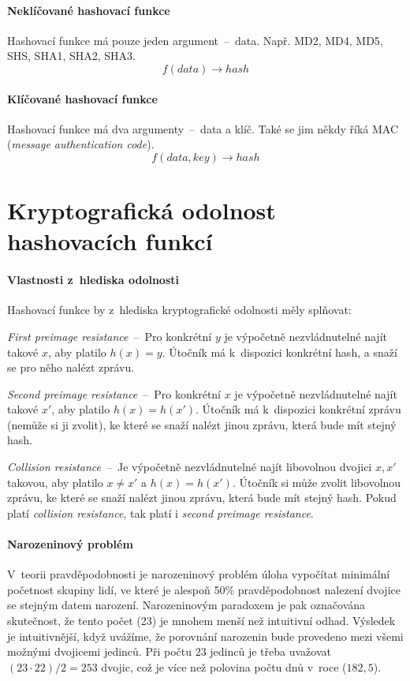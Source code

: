 \paragraph*{Neklíčované hashovací funkce} Hashovací funkce má pouze jeden argument~--~data. Např. MD2, MD4, MD5, SHS, SHA1, SHA2, SHA3. $$f(data) \rightarrow hash$$

\paragraph*{Klíčované hashovací funkce} Hashovací funkce má dva argumenty~--~data a klíč. Také se jim někdy říká MAC (\textit{message authentication code}). $$f(data, key) \rightarrow hash$$


\section{Kryptografická odolnost hashovacích funkcí}

\paragraph*{Vlastnosti z~hlediska odolnosti} Hashovací funkce by z~hlediska kryptografické odolnosti měly splňovat: \begin{compactitem}
    \item \textit{First preimage resistance}~--~Pro konkrétní $y$ je výpočetně nezvládnutelné najít takové $x$, aby platilo $h(x) = y$. Útočník má k~dispozici konkrétní hash, a snaží se pro něho nalézt zprávu.
    \item \textit{Second preimage resistance}~--~Pro konkrétní $x$ je výpočetně nezvládnutelné najít takové $x'$, aby platilo $h(x) = h(x')$. Útočník má k~dispozici konkrétní zprávu (nemůže si ji zvolit), ke které se snaží nalézt jinou zprávu, která bude mít stejný hash.
    \item \textit{Collision resistance}~--~Je výpočetně nezvládnutelné najít libovolnou dvojici $x, x'$ takovou, aby platilo $x \neq x'$ a $h(x) = h(x')$. Útočník si může zvolit libovolnou zprávu, ke které se snaží nalézt jinou zprávu, která bude mít stejný hash. Pokud platí \textit{collision resistance}, tak platí i \textit{second preimage resistance}.
\end{compactitem}

\paragraph*{Narozeninový problém} V~teorii pravděpodobnosti je narozeninový problém úloha vypočítat minimální početnost skupiny lidí, ve které je alespoň 50\% pravděpodobnost nalezení dvojice se stejným datem narození. Narozeninovým paradoxem je pak označována skutečnost, že tento počet (23) je mnohem menší než intuitivní odhad.
Výsledek je intuitivnější, když uvážíme, že porovnání narozenin bude provedeno mezi všemi možnými dvojicemi jedinců. Při počtu 23 jedinců je třeba uvažovat $(23 \cdot 22) / 2 = 253$ dvojic, což je více než polovina počtu dnů v~roce ($182,5$).

